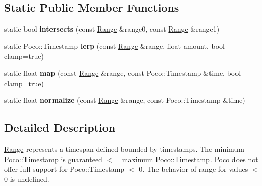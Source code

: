 \subsection*{Static Public Member Functions}
\begin{DoxyCompactItemize}
\item 
\hypertarget{classofx_1_1_time_1_1_range_a0a01fafc7530b9cfd073ea165b88c250}{static bool {\bfseries intersects} (const \hyperlink{classofx_1_1_time_1_1_range}{Range} \&range0, const \hyperlink{classofx_1_1_time_1_1_range}{Range} \&range1)}\label{classofx_1_1_time_1_1_range_a0a01fafc7530b9cfd073ea165b88c250}

\item 
\hypertarget{classofx_1_1_time_1_1_range_a0d94bc7cfbac0378368062f9128ba49a}{static Poco\-::\-Timestamp {\bfseries lerp} (const \hyperlink{classofx_1_1_time_1_1_range}{Range} \&range, float amount, bool clamp=true)}\label{classofx_1_1_time_1_1_range_a0d94bc7cfbac0378368062f9128ba49a}

\item 
\hypertarget{classofx_1_1_time_1_1_range_a89245a53463f024a9a676a23876cbb8c}{static float {\bfseries map} (const \hyperlink{classofx_1_1_time_1_1_range}{Range} \&range, const Poco\-::\-Timestamp \&time, bool clamp=true)}\label{classofx_1_1_time_1_1_range_a89245a53463f024a9a676a23876cbb8c}

\item 
\hypertarget{classofx_1_1_time_1_1_range_a3ed9bb58fe4fd4f32516f4402aedd476}{static float {\bfseries normalize} (const \hyperlink{classofx_1_1_time_1_1_range}{Range} \&range, const Poco\-::\-Timestamp \&time)}\label{classofx_1_1_time_1_1_range_a3ed9bb58fe4fd4f32516f4402aedd476}

\end{DoxyCompactItemize}


\subsection{Detailed Description}
\hyperlink{classofx_1_1_time_1_1_range}{Range} represents a timespan defined bounded by timestamps. The minimum Poco\-::\-Timestamp is guaranteed $<$= maximum Poco\-::\-Timestamp. Poco does not offer full support for Poco\-::\-Timestamp $<$ 0. The behavior of range for values $<$ 0 is undefined. 

